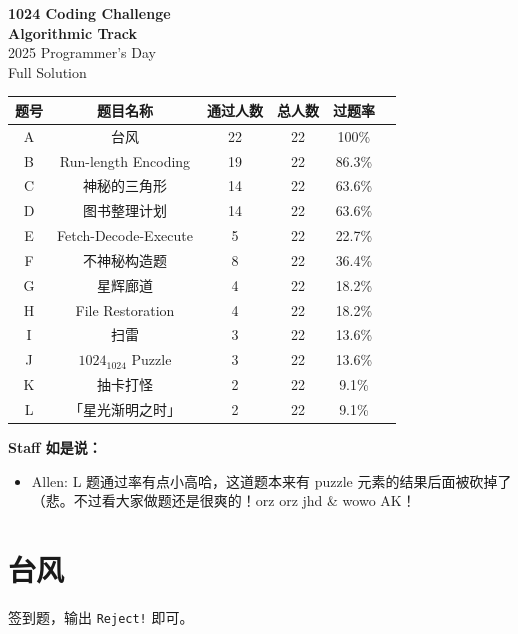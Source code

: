 \documentclass[14pt,a4paper]{article}
\begin{document}
\begin{center}
  {\Huge \bfseries 1024 Coding Challenge}\\[1em]
  {\Huge \bfseries Algorithmic Track}\\[1em]
  { \Large 2025 Programmer's Day }\\[2em]
  {\Large Full Solution}\\[1em]
\end{center}


\begin{table}[htbp]
  \centering
  \setlength{\tabcolsep}{8pt}  %
  \renewcommand{\arraystretch}{1.3} %
  \begin{tabular}{|c|c|c|c|c|c|}
    \hline
     题号 & 题目名称 & 通过人数 & 总人数 & 过题率  \\ \hline %
     A& 台风 & 22 & 22 & 100\% \\ \hline %
     B& Run-length Encoding & 19 & 22 & 86.3\%  \\ \hline %
     C& 神秘的三角形 & 14 & 22 & 63.6\%  \\     \hline %
     D& 图书整理计划 & 14 & 22 & 63.6\% \\ \hline %
     E& Fetch-Decode-Execute & 5 & 22 & 22.7\%  \\ \hline %
     F& 不神秘构造题 & 8 & 22 & 36.4\% \\ \hline %
     G& 星辉廊道 & 4 & 22 & 18.2\%  \\ \hline %
     H& File Restoration & 4 & 22 & 18.2\%  \\ \hline %
     I& 扫雷 & 3 & 22 & 13.6\%  \\ \hline %
     J& $1024_{1024}$ Puzzle & 3 & 22 & 13.6\%  \\ \hline %
     K& 抽卡打怪 & 2 & 22 & 9.1\%  \\ \hline %
     L& 「星光渐明之时」 & 2 & 22 & 9.1\%  \\ \hline %
  \end{tabular}
\end{table}

{ \Large \bfseries Staff 如是说：}
\begin{itemize}
    \item Allen: L 题通过率有点小高哈，这道题本来有 puzzle 元素的结果后面被砍掉了（悲。不过看大家做题还是很爽的！orz orz jhd \& wowo AK！
\end{itemize}
\clearpage

\section{台风}
签到题，输出 \texttt{Reject!} 即可。
\end{document}
